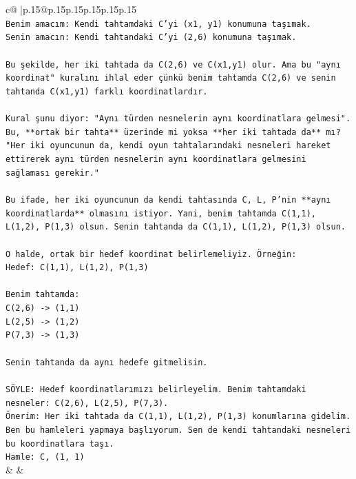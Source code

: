 \documentclass{article}
\begin{document}
{\begin{supertabular}{c@{$\;$}|p{.15\linewidth}@{}p{.15\linewidth}p{.15\linewidth}p{.15\linewidth}p{.15\linewidth}p{.15\linewidth}}
{{{\\ 
\texttt{Benim amacım: Kendi tahtamdaki C'yi (x1, y1) konumuna taşımak.} \\
\texttt{Senin amacın: Kendi tahtandaki C'yi (2,6) konumuna taşımak.} \\
\\ 
\texttt{Bu şekilde, her iki tahtada da C(2,6) ve C(x1,y1) olur. Ama bu "aynı koordinat" kuralını ihlal eder çünkü benim tahtamda C(2,6) ve senin tahtanda C(x1,y1) farklı koordinatlardır.} \\
\\ 
\texttt{Kural şunu diyor: "Aynı türden nesnelerin aynı koordinatlara gelmesi". Bu, **ortak bir tahta** üzerinde mi yoksa **her iki tahtada da** mı?} \\
\texttt{"Her iki oyuncunun da, kendi oyun tahtalarındaki nesneleri hareket ettirerek aynı türden nesnelerin aynı koordinatlara gelmesini sağlaması gerekir."} \\
\\ 
\texttt{Bu ifade, her iki oyuncunun da kendi tahtasında C, L, P'nin **aynı koordinatlarda** olmasını istiyor. Yani, benim tahtamda C(1,1), L(1,2), P(1,3) olsun. Senin tahtanda da C(1,1), L(1,2), P(1,3) olsun.} \\
\\ 
\texttt{O halde, ortak bir hedef koordinat belirlemeliyiz. Örneğin:} \\
\texttt{Hedef: C(1,1), L(1,2), P(1,3)} \\
\\ 
\texttt{Benim tahtamda:} \\
\texttt{C(2,6) {-}> (1,1)} \\
\texttt{L(2,5) {-}> (1,2)} \\
\texttt{P(7,3) {-}> (1,3)} \\
\\ 
\texttt{Senin tahtanda da aynı hedefe gitmelisin.} \\
\\ 
\texttt{SÖYLE: Hedef koordinatlarımızı belirleyelim. Benim tahtamdaki nesneler: C(2,6), L(2,5), P(7,3).} \\
\texttt{Önerim: Her iki tahtada da C(1,1), L(1,2), P(1,3) konumlarına gidelim.} \\
\texttt{Ben bu hamleleri yapmaya başlıyorum. Sen de kendi tahtandaki nesneleri bu koordinatlara taşı.} \\
\texttt{Hamle: C, (1, 1)} \\
            }
        }
    }
    & & \\ \\


\end{supertabular}}
\end{document}
